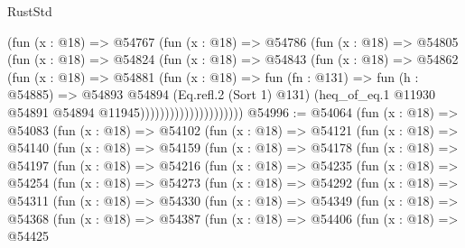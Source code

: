 \begin{lexlean}{RustStd}
\begin{coremodule}
                            (fun (x : @18) =>
                            @54767
                              (fun (x : @18) =>
                              @54786
                                (fun (x : @18) =>
                                @54805
                                  (fun (x : @18) =>
                                  @54824
                                    (fun (x : @18) =>
                                    @54843
                                      (fun (x : @18) =>
                                      @54862
                                        (fun (x : @18) =>
                                        @54881
                                          (fun (x : @18) =>
                                          fun (fn : @131) =>
                                          fun (h : @54885) =>
                                          @54893
                                            @54894
                                            (Eq.refl.{2} (Sort 1) @131)
                                            (heq_of_eq.{1}
                                              @11930
                                              @54891
                                              @54894
                                              @11945)))))))))))))))))))))
@54996 := @54064
    (fun (x : @18) =>
    @54083
      (fun (x : @18) =>
      @54102
        (fun (x : @18) =>
        @54121
          (fun (x : @18) =>
          @54140
            (fun (x : @18) =>
            @54159
              (fun (x : @18) =>
              @54178
                (fun (x : @18) =>
                @54197
                  (fun (x : @18) =>
                  @54216
                    (fun (x : @18) =>
                    @54235
                      (fun (x : @18) =>
                      @54254
                        (fun (x : @18) =>
                        @54273
                          (fun (x : @18) =>
                          @54292
                            (fun (x : @18) =>
                            @54311
                              (fun (x : @18) =>
                              @54330
                                (fun (x : @18) =>
                                @54349
                                  (fun (x : @18) =>
                                  @54368
                                    (fun (x : @18) =>
                                    @54387
                                      (fun (x : @18) =>
                                      @54406
                                        (fun (x : @18) =>
                                        @54425

\end{coremodule}
\end{lexlean}
